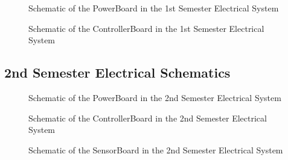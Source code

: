     \begin{figure}[H]
      \begin{center}
        \caption{Schematic of the PowerBoard in the 1st Semester Electrical System}
        \label{fig:PowerBoardSchematic}
      \end{center}
    \end{figure}

    \begin{figure}[H]
      \begin{center}
        \caption{Schematic of the ControllerBoard in the 1st Semester Electrical System}
        \label{fig:ControllerBoardSchematic}
      \end{center}
    \end{figure}

  \subsection{2nd Semester Electrical Schematics}
  \label{sub:2nd Semester Electrical Schematics}

    \begin{figure}[H]
      \begin{center}
        \caption{Schematic of the PowerBoard in the 2nd Semester Electrical System}
        \label{fig:PowerBoardSchematicV2}
      \end{center}
    \end{figure}

    \begin{figure}[H]
      \begin{center}
        \caption{Schematic of the ControllerBoard in the 2nd Semester Electrical System}
        \label{fig:ControllerBoardV2Schematic}
      \end{center}
    \end{figure}

    \begin{figure}[H]
      \begin{center}
        \caption{Schematic of the SensorBoard in the 2nd Semester Electrical System}
        \label{fig:LineSensorBoardSchematic}
      \end{center}
    \end{figure}

